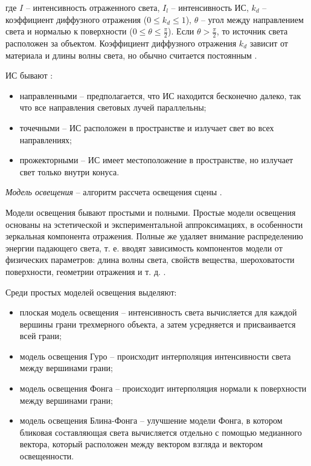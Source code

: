 где $I$ -- интенсивность отраженного света, $I_l$ -- интенсивность ИС, $k_d$ -- коэффициент диффузного отражения ($0 \leq k_d \leq 1$), $\theta$ -- угол между направлением света и нормалью к поверхности ($0 \leq \theta \leq \frac{\pi}{2}$). Если $\theta > \frac{\pi}{2}$, то источник света расположен за объектом. Коэффициент диффузного отражения $k_d$ зависит от материала и длины волны света, но обычно считается постоянным \cite{rogers}.

ИС бывают \cite{eberly20063d}:

\begin{itemize}
	\item направленными -- предполагается, что ИС находится бесконечно далеко, так что все направления световых лучей параллельны;
	\item точечными -- ИС расположен в пространстве и излучает свет во всех направлениях;
	\item прожекторными -- ИС имеет местоположение в пространстве, но излучает свет только внутри конуса.
\end{itemize}

\textit{Модель освещения} -- алгоритм рассчета освещения сцены \cite{eberly20063d}. 

Модели освещения бывают простыми и полными. Простые модели освещения основаны на эстетической и экспериментальной аппроксимациях, в особенности зеркальная компонента отражения. Полные же удаляет внимание распределению энергии падающего света, т. е. вводят зависимость компонентов модели от физических параметров: длина волны света, свойств вещества, шероховатости поверхности, геометрии отражения и т. д. \cite{rogers}.

Среди простых моделей освещения выделяют:

\begin{itemize}
	\item плоская модель освещения -- интенсивность света вычисляется для каждой вершины грани трехмерного объекта, а затем усредняется и присваивается всей грани;
	\item модель освещения Гуро -- происходит интерполяция интенсивности света между вершинами грани;
	\item модель освещения Фонга -- происходит интерполяция нормали к поверхности между вершинами грани;
	\item модель освещения Блина-Фонга -- улучшение модели Фонга, в котором бликовая составляющая света вычисляется отдельно с помощью медианного вектора, который расположен между вектором взгляда и вектором освещенности.
\end{itemize}

